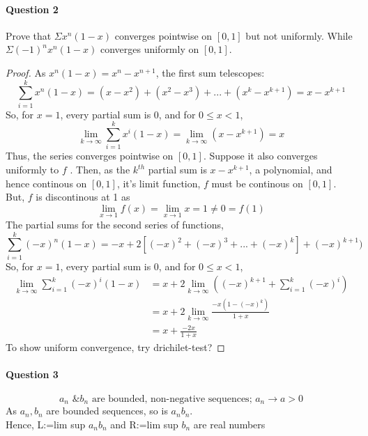 \documentclass[20pt,a4paper]{extarticle} %
\begin{document}
\paragraph{Question 2}
Prove that $\Sigma x^n(1-x)$ converges pointwise on $[0,1]$ but not uniformly.
While $\Sigma (-1)^nx^n(1-x) $ converges uniformly on $[0,1]$.
\begin{proof}
	As $x^n(1-x) = x^n - x^{n+1}$, the first sum telescopes:
	\[\sum_{i=1}^k x^n(1-x) = (x - x^2) + (x^2 -x^3) +... + (x^k -x^{k+1}) = x- x^{k+1} \]
	So, for $x=1$, every partial sum is 0, and for $0\leq x <1$,
	\[ \lim_{k \to \infty } \sum_{i=1}^k x^i(1-x) = \lim_{k \to \infty }(x - x^{k+1})=x\]
	Thus, the series converges pointwise on $[0,1]$. Suppose it also converges uniformly to $f$ .
	Then, as the $k^{th}$ partial sum is $x-x^{k+1}$, a polynomial, and hence continous on $[0,1]$,
	it's limit function, $f$ must be continous on $[0,1]$. But, $f$ is discontinous at 1 as
	\[ \lim_{x \to 1} f(x) = \lim_{x \to 1} x = 1 \neq 0 = f(1) \]
	\pagebreak
	The partial sums for the second series of functions,
	\[\sum_{i=1}^k (-x)^n(1-x) = -x +2[(-x)^2 + (-x)^3 + ... + (-x)^k] + (-x)^{k+1})\]
	So, for $x=1$, every partial sum is 0, and for $0\leq x <1$,
	\begin{align*}
		\lim_{k \to \infty } \sum_{i=1}^k (-x)^i(1-x) &= x + 2\lim_{k \to \infty }((-x)^{k+1}+\sum_{i=1}^k (-x)^i ) \\
							      &=x + 2 \lim_{k \to \infty }\frac{-x(1-(-x)^k)}{1+x}\\
							      &=x+\frac{-2x}{1+x}
	\end{align*}
	To show uniform convergence, try drichilet-test?

\end{proof}

\pagebreak

\paragraph{Question 3}
\[\text{ $a_n$ \& $b_n$ are bounded, non-negative sequences; $a_n \rightarrow a >0 $   } \]
As $a_n, b_n $ are bounded sequences, so is $a_n b_n$.\\
Hence, L:=lim sup $a_n b_n $ and R:=lim sup $b_n$ are real numbers
\end{document}
